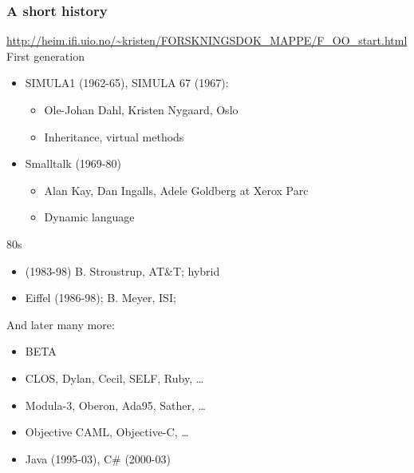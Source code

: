 \documentclass{beamer}
\begin{document}
\begin{frame}[fragile]
\frametitle{A short history}
\url{http://heim.ifi.uio.no/~kristen/FORSKNINGSDOK_MAPPE/F_OO_start.html}
First generation
\begin{itemize}
\item SIMULA1 (1962-65), SIMULA 67 (1967): 
\begin{itemize}
\item Ole-Johan Dahl, Kristen Nygaard, Oslo
\item Inheritance, virtual methods
\end{itemize}
\item Smalltalk (1969-80) 
\begin{itemize}
\item Alan Kay, Dan Ingalls, Adele Goldberg at Xerox Parc
\item Dynamic language %
\end{itemize}
\end{itemize}

80s
\begin{itemize}
\item \cpp(1983-98)
B. Stroustrup, AT\&T; hybrid
\item Eiffel (1986-98); B. Meyer, ISI; %

\end{itemize}

And later many more:
\begin{itemize}
\item BETA
\item CLOS, Dylan, Cecil, SELF, Ruby, \ldots
\item  Modula-3, Oberon, Ada95, Sather, \ldots
\item Objective CAML, Objective-C, \ldots
\item Java (1995-03),
C\# (2000-03)


\end{itemize}

\end{frame}
\end{document}
